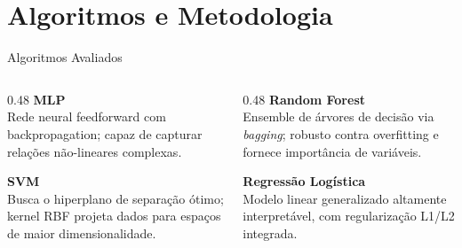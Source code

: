 \documentclass[10pt]{beamer}
\begin{document}
\section{Algoritmos e Metodologia}
\begin{frame}{Algoritmos Avaliados}
    \begin{columns}
        \begin{column}{0.48\textwidth}
            \textbf{MLP}\\
            \footnotesize Rede neural feedforward com backpropagation; capaz de capturar relações não-lineares complexas.
            \vspace{0.3cm}

            \textbf{SVM}\\
            \footnotesize Busca o hiperplano de separação ótimo; kernel RBF projeta dados para espaços de maior dimensionalidade.
        \end{column}
        \begin{column}{0.48\textwidth}
            \textbf{Random Forest}\\
            \footnotesize Ensemble de árvores de decisão via \textit{bagging}; robusto contra overfitting e fornece importância de variáveis.
            \vspace{0.3cm}

            \textbf{Regressão Logística}\\
            \footnotesize Modelo linear generalizado altamente interpretável, com regularização L1/L2 integrada.
        \end{column}
    \end{columns}
\end{frame}
\end{document}
